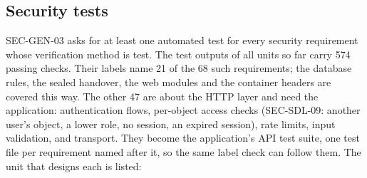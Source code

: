 \documentclass[11pt,a4paper]{article}
\begin{document}
\subsection{Security tests}
\label{sec:sectests}
SEC-GEN-03 asks for at least one automated test for every security requirement whose verification method is test. The test outputs of all units so far carry 574 passing checks. Their labels name 21 of the 68 such requirements; the database rules, the sealed handover, the web modules and the container headers are covered this way. The other 47 are about the HTTP layer and need the application: authentication flows, per-object access checks (SEC-SDL-09: another user's object, a lower role, no session, an expired session), rate limits, input validation, and transport. They become the application's API test suite, one test file per requirement named after it, so the same label check can follow them. The unit that designs each is listed:
\end{document}
